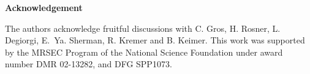 \documentclass[prb,preprint,draft,amsmath,showpacs]{revtex4}
\begin{document}

{\bf Acknowledgement}

The authors acknowledge fruitful discussions with C. Gros, H. Rosner, L. Degiorgi,
E.~Ya. Sherman, R. Kremer and B. Keimer. This work was supported by the MRSEC Program of
the National Science Foundation under award number DMR 02-13282, and DFG SPP1073.



%




\end{document}
